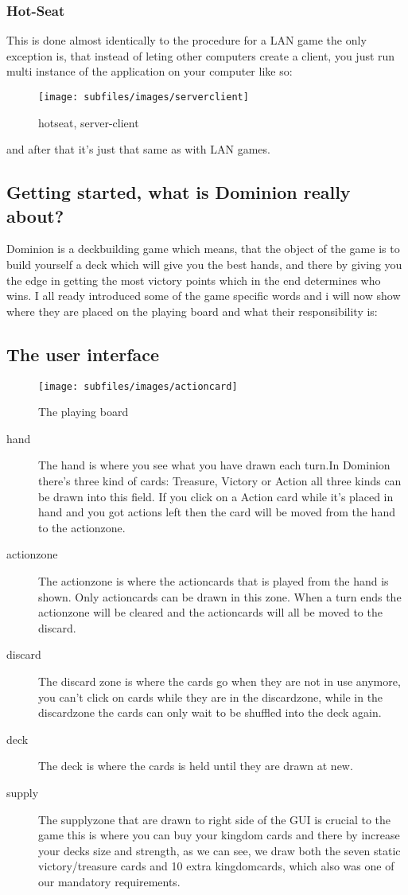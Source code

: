 \subsubsection{Hot-Seat}
This is done almost identically to the procedure for a LAN game the only exception is, that instead of leting other computers create a client, you just run multi instance of the application on your computer like so:
\begin{figure}[h!]
\centering
\texttt{[image: subfiles/images/serverclient]}
\caption{hotseat, server-client}
\end{figure}
and after that it's just that same as with LAN games.


\subsection{Getting started, what is Dominion really about?}
Dominion is a deckbuilding game which means, that the object of the game is to build yourself a deck which will give you the best hands, and there by giving you the edge in getting the most victory points which in the end determines who wins.
I all ready introduced some of the game specific words and i will now show where they are placed on the playing board and what their responsibility is:

\subsection{The user interface}

\begin{figure}[h!]
\centering
\texttt{[image: subfiles/images/actioncard]}
\caption{The playing board}
\end{figure}
\begin{description}
\item[hand]The hand is where you see what you have drawn each turn.In Dominion there's three kind of cards: Treasure, Victory or Action all three kinds can be drawn into this field. If you click on a Action card while it's placed in hand and you got actions left then the card will be moved from the hand to the actionzone.
\item[actionzone] The actionzone is where the actioncards that is played from the hand is shown. Only actioncards can be drawn in this zone. When a turn ends the actionzone will be cleared and the actioncards will all be moved to the discard.
\item[discard] The discard zone is where the cards go when they are not in use anymore, you can't click on cards while they are in the discardzone, while in the discardzone the cards can only wait to be shuffled into the deck again.
\item[deck] The deck is where the cards is held until they are drawn at new.
\item [supply] The supplyzone that are drawn to right side of the GUI is crucial to the game this is where you can buy your kingdom cards and there by increase your decks size and strength, as we can see, we draw both the seven static victory/treasure cards and 10 extra kingdomcards, which also was one of our mandatory requirements.
\end{description}

